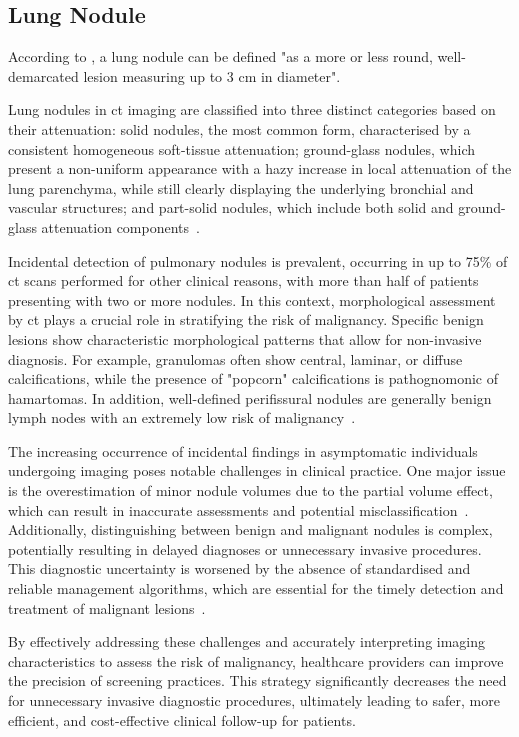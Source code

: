 \subsection{Lung Nodule}
According to \textcite{baum_incidental_2024, loverdos_lung_2019}, a lung nodule can be defined "as a more or less round, well-demarcated lesion measuring up to 3 cm in diameter".

Lung nodules in \ac{ct} imaging are classified into three distinct categories based on their attenuation: solid nodules, the most common form, characterised by a consistent homogeneous soft-tissue attenuation; ground-glass nodules, which present a non-uniform appearance with a hazy increase in local attenuation of the lung parenchyma, while still clearly displaying the underlying bronchial and vascular structures; and part-solid nodules, which include both solid and ground-glass attenuation components~\cite{loverdos_lung_2019}.

Incidental detection of pulmonary nodules is prevalent, occurring in up to 75\% of \ac{ct} scans performed for other clinical reasons, with more than half of patients presenting with two or more nodules. In this context, morphological assessment by \ac{ct} plays a crucial role in stratifying the risk of malignancy. Specific benign lesions show characteristic morphological patterns that allow for non-invasive diagnosis. For example, granulomas often show central, laminar, or diffuse calcifications, while the presence of "popcorn" calcifications is pathognomonic of hamartomas. In addition, well-defined perifissural nodules are generally benign lymph nodes with an extremely low risk of malignancy~\cite{baum_incidental_2024}.

The increasing occurrence of incidental findings in asymptomatic individuals undergoing imaging poses notable challenges in clinical practice. One major issue is the overestimation of minor nodule volumes due to the partial volume effect, which can result in inaccurate assessments and potential misclassification~\cite{larici_lung_2017}. Additionally, distinguishing between benign and malignant nodules is complex, potentially resulting in delayed diagnoses or unnecessary invasive procedures.
This diagnostic uncertainty is worsened by the absence of standardised and reliable management algorithms, which are essential for the timely detection and treatment of malignant lesions~\cite{loverdos_lung_2019}.

By effectively addressing these challenges and accurately interpreting imaging characteristics to assess the risk of malignancy, healthcare providers can improve the precision of screening practices. This strategy significantly decreases the need for unnecessary invasive diagnostic procedures, ultimately leading to safer, more efficient, and cost-effective clinical follow-up for patients.

